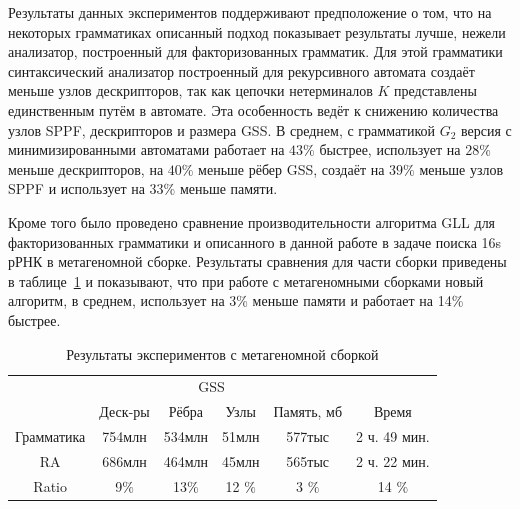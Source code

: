 \documentclass[14pt]{matmex-diploma-custom}
\begin{document}
    Результаты данных экспериментов поддерживают предположение о том, что на некоторых грамматиках 
    описанный подход показывает результаты лучше, нежели анализатор, построенный для факторизованных грамматик.
    Для этой грамматики синтаксический анализатор построенный 
    для рекурсивного автомата создаёт меньше узлов дескрипторов, так как 
    цепочки нетерминалов $K$ представлены единственным путём в автомате. Эта особенность ведёт к снижению количества 
    узлов SPPF, дескрипторов и размера GSS.
    В среднем, с грамматикой $G_2$ версия с минимизированными автоматами работает на $43\%$ быстрее,
    использует на $28\%$ меньше дескрипторов, на $40\%$ меньше рёбер GSS, создаёт на $39\%$ меньше узлов SPPF
    и использует на $33\%$ меньше памяти.
    
    Кроме того было проведено сравнение производительности алгоритма GLL для факторизованных грамматики и описанного в данной 
    работе в задаче поиска 16s рРНК в метагеномной сборке.
    Результаты сравнения для части сборки приведены в таблице~\ref{expTable1} и показывают, что при работе с метагеномными сборками новый
    алгоритм, в среднем, использует на 3\% меньше памяти и работает на 14\% быстрее.
    
    \begin{table}[h]
        \begin{center}
        \begin{tabular}{ | c | c | c | c | c | c |}
            \hline
            & &\multicolumn{2}{c|}{GSS} & & \\
            \cline{3-4}
            &  Деск-ры & Рёбра & Узлы & Память, мб &Время   \\ \hline
            Грамматика  &  754млн & 534млн & 51млн & 577тыс & 2 ч. 49 мин.  \\ \hline
            RA &  686млн &  464млн & 45млн & 565тыс & 2 ч. 22 мин.  \\ \hline \hline
            Ratio   &  9$\%$       & 13$\%$     & 12 $\%$    &  3 $\%$  & 14 $\%$\\ \hline
        \end{tabular}
        \caption{Результаты экспериментов с метагеномной сборкой}
        \label{expTable1}
        \end{center}
    \end{table}
	
\end{document}
